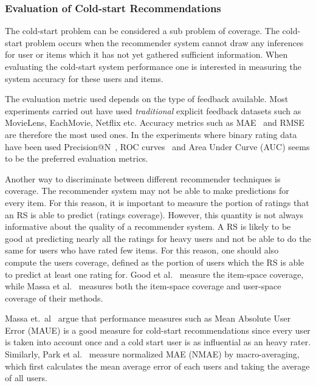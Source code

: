 \subsubsection{Evaluation of Cold-start Recommendations}
\label{sec:cold-start-eval}

The cold-start problem can be considered a sub problem of coverage. The cold-start
problem occurs when the recommender system cannot draw any inferences for user or items
which it has not yet gathered sufficient information. When
evaluating the cold-start system performance one is interested in measuring the
system accuracy for these users and items.

The evaluation metric used depends on the type of feedback available.
Most experiments carried out have used \emph{traditional} explicit feedback datasets such as
MovieLens, EachMovie, Netflix etc. Accuracy metrics such as MAE~\cite{Rashid2002, Rashid2008, Massa2004,
Massa2007, Stern2009} and RMSE~\cite{Agarwal2009, Agarwal2010} are therefore
the most used ones. In the experiments where binary rating data have been used
Precision@N~\cite{Liu2011, Gantner2010}, ROC curves~\cite{Agarwal2009,
Gantner2010, Schein2002} and Area Under Curve (AUC) \cite{Liu2011, Gantner2010} seems to be the
preferred evaluation metrics.

Another way to discriminate between different recommender techniques is
coverage. The recommender system may not be able to make predictions for every
item. For this reason, it is important to measure the portion of ratings that
an RS is able to predict (ratings coverage). However, this quantity is not
always informative about the quality of a recommender system. A RS is likely to
be good at predicting nearly all the ratings for heavy users and not be able to
do the same for users who have rated few items. For this reason, one should
also compute the users coverage, defined as the portion of users which the RS
is able to predict at least one rating for. Good et al.~\cite{Good1999}
measure the item-space coverage, while Massa et al.~\cite{Massa2004,
Massa2007} measures both the item-space coverage and user-space coverage of
their methods.

Massa et.\ al~\cite{Massa2004} argue that performance measures such as Mean
Absolute User Error (MAUE) is a good measure for cold-start recommendations
since every user is taken into account once and a cold start user is as
influential as an heavy rater. Similarly, Park et al.~\cite{Park2006} measure
normalized MAE (NMAE) by macro-averaging, which first calculates the mean
average error of each users and taking the average of all users.

